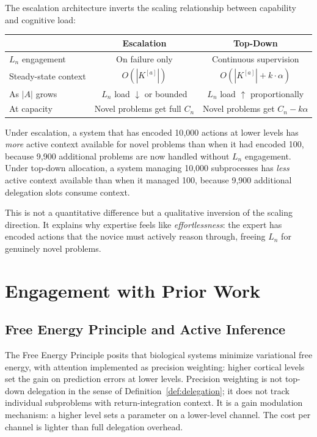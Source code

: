 \documentclass[11pt]{article}
\theoremstyle{definition}
\begin{document}
The escalation architecture inverts the scaling relationship between
capability and cognitive load:

\begin{center}
\begin{tabular}{@{}lcc@{}}
\toprule
& \textbf{Escalation} & \textbf{Top-Down} \\
\midrule
$L_n$ engagement & On failure only & Continuous supervision \\
Steady-state context & $O(|K^{[a]}|)$ & $O(|K^{[a]}| + k \cdot
\alpha)$ \\
As $|A|$ grows & $L_n$ load $\downarrow$ or bounded &
$L_n$ load $\uparrow$ proportionally \\
At capacity & Novel problems get full $C_n$ &
Novel problems get $C_n - k\alpha$ \\
\bottomrule
\end{tabular}
\end{center}

Under escalation, a system that has encoded 10{,}000 actions at lower
levels has \emph{more} active context available for novel problems than
when it had encoded 100, because 9{,}900 additional problems are
now handled without $L_n$ engagement. Under top-down allocation, a
system managing 10{,}000 subprocesses has \emph{less} active context
available than when it managed 100, because 9{,}900 additional
delegation slots consume context.

This is not a quantitative difference but a qualitative inversion of
the scaling direction. It explains why expertise feels like
\emph{effortlessness}: the expert has encoded actions that the novice
must actively reason through, freeing $L_n$ for genuinely novel
problems.

\section{Engagement with Prior Work}
\label{sec:prior}

\subsection{Free Energy Principle and Active Inference}

The Free Energy Principle \cite{Friston2010,Friston2017} posits that
biological systems minimize variational free energy, with attention
implemented as precision weighting: higher cortical levels set the gain
on prediction errors at lower levels. Precision weighting is not
top-down delegation in the sense of Definition~\ref{def:delegation}; it
does not track individual subproblems with return-integration context.
It is a gain modulation mechanism: a higher level sets a parameter on a
lower-level channel. The cost per channel is lighter than full
delegation overhead.
\end{document}
